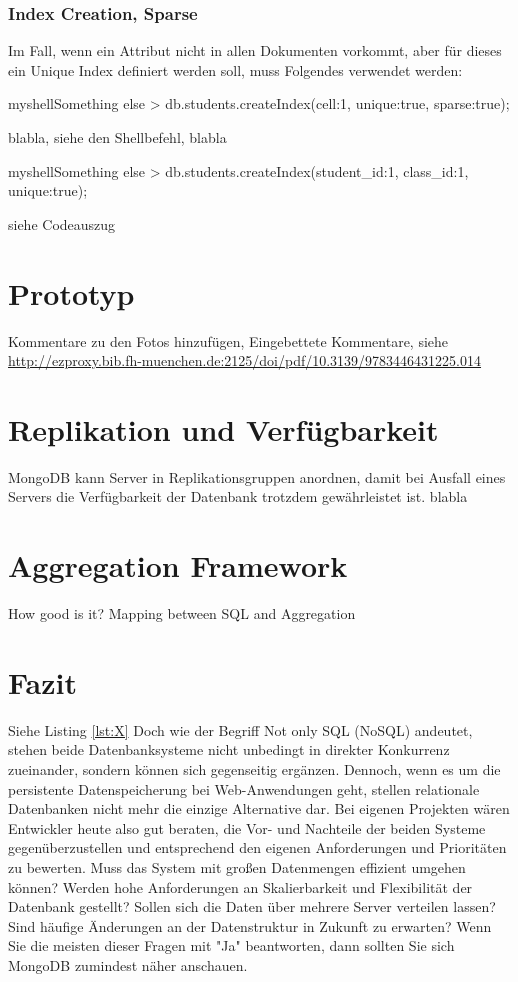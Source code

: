 \subsubsection{Index Creation, Sparse}

Im Fall, wenn ein Attribut nicht in allen Dokumenten vorkommt, aber für dieses ein Unique Index definiert werden soll, muss Folgendes verwendet werden:

\begin{listingsbox}[label={lst:X}]{myshell}{Something else}
> db.students.createIndex({cell:1}, {unique:true, sparse:true});
\end{listingsbox}

blabla, siehe den Shellbefehl, blabla

\begin{listingsbox}[label={lst:X}]{myshell}{Something else}
> db.students.createIndex({student_id:1, class_id:1}, {unique:true});
\end{listingsbox}
siehe Codeauszug 

\section{Prototyp}
Kommentare zu den Fotos hinzufügen, Eingebettete Kommentare, siehe \url{http://ezproxy.bib.fh-muenchen.de:2125/doi/pdf/10.3139/9783446431225.014}

\section{Replikation und Verfügbarkeit}
MongoDB kann Server in Replikationsgruppen anordnen, damit bei Ausfall eines Servers die Verfügbarkeit der Datenbank trotzdem gewährleistet ist. blabla
\section{Aggregation Framework}
How good is it? Mapping between SQL and Aggregation
\section{Fazit}
Siehe Listing \ref{lst:X} \newline 
Doch wie der Begriff Not only SQL (NoSQL) andeutet, stehen beide Datenbanksysteme nicht unbedingt in direkter Konkurrenz zueinander, sondern können sich gegenseitig ergänzen. Dennoch, wenn es um die persistente Datenspeicherung bei Web-Anwendungen geht, stellen relationale Datenbanken nicht mehr die einzige Alternative dar. Bei eigenen Projekten wären Entwickler heute also gut beraten, die Vor- und Nachteile der beiden Systeme gegenüberzustellen und entsprechend den eigenen Anforderungen und Prioritäten zu bewerten. Muss das System mit großen Datenmengen effizient umgehen können? Werden hohe Anforderungen an Skalierbarkeit und Flexibilität der Datenbank gestellt? Sollen sich die Daten über mehrere Server verteilen lassen? Sind häufige Änderungen an der Datenstruktur in Zukunft zu erwarten? Wenn Sie die meisten dieser Fragen mit "Ja" beantworten, dann sollten Sie sich MongoDB zumindest näher anschauen.\newline\newline

